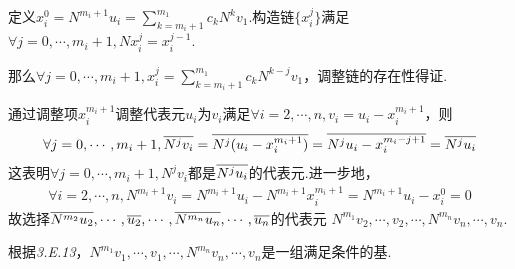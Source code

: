 定义\(x_i^0=N^{m_i+1}u_i=\sum_{k=m_i+1}^{m_1}c_kN^kv_1\).构造链\(\{x_i^j\}\)满足
\(\forall j=0,\cdots,m_i+1,Nx_i^j=x_i^{j-1}\).

那么\(\forall j=0,\cdots,m_i+1,x_i^j=\sum_{k=m_i+1}^{m_1}c_kN^{k-j}v_1\)，调整链的存在性得证.

通过调整项\(x_i^{m_i+1}\)调整代表元\(u_i\)为\(v_i\)满足\(\forall i=2,\cdots,n,v_i=u_i-x_i^{m_i+1}\)，则
    \begin{align*}
        \forall j=0,\cdots,m_i+1,\overline{N^jv_i}=\overline{N^j(u_i-x_i^{m_i+1})}=\overline{N^ju_i-x_i^{m_i-j+1}}=\overline{N^ju_i} 
    \end{align*}
这表明\(\forall j=0,\cdots,m_i+1, N^jv_i\)都是\(\overline{N^ju_i}\)的代表元.进一步地，
    \begin{align*}
        \forall i=2,\cdots,n,N^{m_i+1}v_i=N^{m_i+1}u_i-N^{m_i+1}x_i^{m_i+1}=N^{m_i+1}u_i-x_i^0=0
    \end{align*}
故选择\(\overline{N^{m_2}u_2},\cdots,\overline{u_2},\cdots,\overline{N^{m_n}u_n},\cdots,\overline{u_n}\)的代表元
\(N^{m_1}v_2,\cdots,v_2,\cdots,N^{m_n}v_n,\cdots,v_n\).

根据\textit{3.E.13}，\(N^{m_1}v_1,\cdots,v_1,\cdots,N^{m_n}v_n,\cdots,v_n\)是一组满足条件的基.

